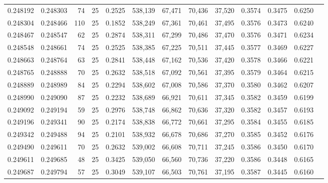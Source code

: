 \begin{tabular}{rrrrrrrrrrrrr}
0.248192 & 0.248303 &    74 &  25 &                                     0.2525 & 538,139 &  67,471 &  70,436 &  37,520 & 0.3574 & 0.3475 & 0.6250 \\
0.248304 & 0.248466 &   110 &  25 &                                     0.1852 & 538,249 &  67,361 &  70,461 &  37,495 & 0.3576 & 0.3473 & 0.6240 \\
0.248467 & 0.248547 &    62 &  25 &                                     0.2874 & 538,311 &  67,299 &  70,486 &  37,470 & 0.3576 & 0.3471 & 0.6234 \\
0.248548 & 0.248661 &    74 &  25 &                                     0.2525 & 538,385 &  67,225 &  70,511 &  37,445 & 0.3577 & 0.3469 & 0.6227 \\
0.248663 & 0.248764 &    63 &  25 &                                     0.2841 & 538,448 &  67,162 &  70,536 &  37,420 & 0.3578 & 0.3466 & 0.6221 \\
0.248765 & 0.248888 &    70 &  25 &                                     0.2632 & 538,518 &  67,092 &  70,561 &  37,395 & 0.3579 & 0.3464 & 0.6215 \\
0.248889 & 0.248989 &    84 &  25 &                                     0.2294 & 538,602 &  67,008 &  70,586 &  37,370 & 0.3580 & 0.3462 & 0.6207 \\
0.248990 & 0.249090 &    87 &  25 &                                     0.2232 & 538,689 &  66,921 &  70,611 &  37,345 & 0.3582 & 0.3459 & 0.6199 \\
0.249092 & 0.249194 &    59 &  25 &                                     0.2976 & 538,748 &  66,862 &  70,636 &  37,320 & 0.3582 & 0.3457 & 0.6193 \\
0.249196 & 0.249341 &    90 &  25 &                                     0.2174 & 538,838 &  66,772 &  70,661 &  37,295 & 0.3584 & 0.3455 & 0.6185 \\
0.249342 & 0.249488 &    94 &  25 &                                     0.2101 & 538,932 &  66,678 &  70,686 &  37,270 & 0.3585 & 0.3452 & 0.6176 \\
0.249490 & 0.249611 &    70 &  25 &                                     0.2632 & 539,002 &  66,608 &  70,711 &  37,245 & 0.3586 & 0.3450 & 0.6170 \\
0.249611 & 0.249685 &    48 &  25 &                                     0.3425 & 539,050 &  66,560 &  70,736 &  37,220 & 0.3586 & 0.3448 & 0.6165 \\
0.249687 & 0.249794 &    57 &  25 &                                     0.3049 & 539,107 &  66,503 &  70,761 &  37,195 & 0.3587 & 0.3445 & 0.6160 \\

\end{tabular}
